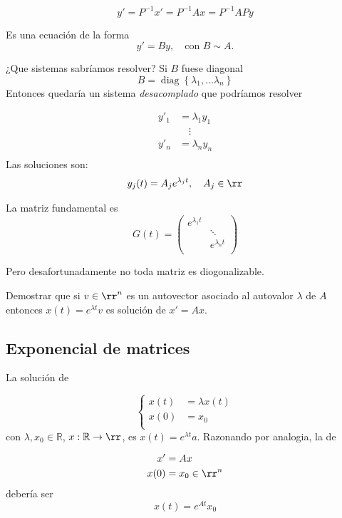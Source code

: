 $$
y'=P^{-1} x'=P^{-1} A x=P^{-1}A Py
$$

Es una ecuación de la forma 
\[y'=By,\quad \text{con } B \sim A.\]

¿Que sistemas sabríamos resolver? Si $B$ fuese diagonal 
\[B=\operatorname{diag} \left\{ \lambda_{1},\ldots \lambda_{n}\right\}\]
Entonces quedaría un sistema \emph{desacomplado} que podríamos resolver

\[
\begin{split}
y'_{1}&=\lambda_{1} y_{1} \\
&\quad \vdots\\
y'_{n}&=\lambda_{n} y_{n} \\
\end{split}
\]
Las soluciones son:
\[y_{j}(t)=A_{j} e^{\lambda_{j} t},\quad A_j\in\rr
\]
 
La matriz fundamental es
\begin{equation}\label{eq:MF_diagona}
G(t)=\begin{pmatrix}
e^{\lambda_{1} t} & \\
& \ddots \\
& e^{\lambda_{n} t}\\
\end{pmatrix}
\end{equation}

Pero desafortunadamente no toda matriz es diogonalizable. 

\begin{ejercicio}{} Demostrar que si $v\in\rr^n$ es un autovector asociado al autovalor $\lambda$ de $A$ entonces $x(t)=e^{\lambda t}v$ es solución de $x'=Ax$. 
 \end{ejercicio}

\subsection{Exponencial de matrices}


La solución de 

$$
\left\{
\begin{split}
    x(t)&=\lambda x(t)  \\
    x(0)&=x_0 \\
\end{split}
\right.
$$
con $\lambda,x_0 \in \mathbb{R}$, $x:\mathbb{R}\to\rr$, es $x(t)=e^{\lambda t} a$. Razonando por analogia, la de

\[
 \begin{split}
  x'&=Ax\\
  x(0)&=x_0\in\rr^n\\
 \end{split}
\]
debería ser 
\[x(t)=e^{A t}x_0\]

